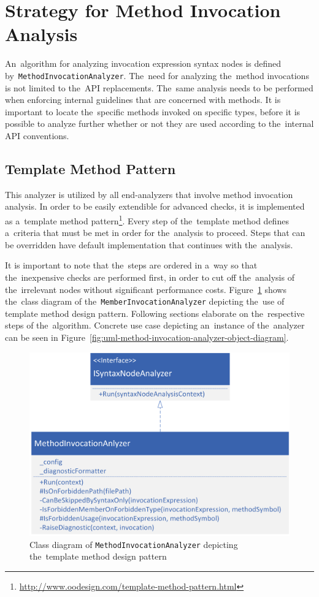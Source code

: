 \documentclass[
  digital, %
  table,   %
  lof,     %
  lot,     %
  oneside,
]{fithesis3}
\begin{document}
\section{Strategy for Method Invocation Analysis}
An~algorithm for analyzing invocation expression syntax nodes is defined by~\texttt{MethodInvocationAnalyzer}. The~need for analyzing the~method invocations is not limited to the~API replacements. The~same analysis needs to be performed when enforcing internal guidelines that are concerned with methods. It is important to locate the~specific methods invoked on specific types, before it is possible to analyze further whether or not they are used according to the~internal API conventions. 

\subsection{Template Method Pattern}
This analyzer is utilized by all end-analyzers that involve method invocation analysis. In order to be easily extendible for advanced checks, it is implemented as a~template method pattern\footnote{\url{http://www.oodesign.com/template-method-pattern.html}}. Every step of the~template method defines a~criteria that must be met in order for the~analysis to proceed. Steps that can be overridden have default implementation that continues with the~analysis. 

It is important to note that the~steps are ordered in a~way so that the~inexpensive checks are performed first, in order to cut off the~analysis of the~irrelevant nodes without significant performance costs. Figure~\ref{fig:uml-method-invocation-analyzer} shows the~class diagram of the~\texttt{MemberInvocationAnalyzer} depicting the~use of template method design pattern. Following sections elaborate on the~respective steps of the~algorithm. Concrete use case depicting an~instance of the~analyzer can be seen in Figure~\ref{fig:uml-method-invocation-analyzer-object-diagram}.  

\begin{figure}[h!]
		\centering
			\includegraphics[scale=0.85]{img/uml/method-invocation-analyzer}
		\caption{Class diagram of \texttt{MethodInvocationAnalyzer} depicting the~template method design pattern}
		\label{fig:uml-method-invocation-analyzer}
\end{figure}
\end{document}
